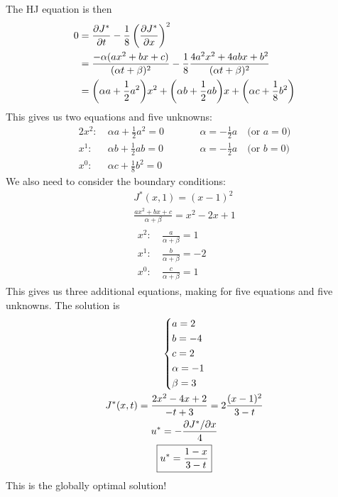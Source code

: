 The HJ equation is then
\begin{align}
  0 &= \frac{\partial J^*}{\partial t} - \frac{1}{8} \left(\frac{\partial J^*}{\partial x}\right)^2 \\
    &= \frac{-\alpha(ax^2 + bx + c)}{(\alpha t + \beta)^2} - \frac{1}{8} \frac{4a^2x^2 + 4abx + b^2}{(\alpha t + \beta)^2} \\
    &= \bigg(\alpha a + \frac12 a^2\bigg) x^2 + \bigg(\alpha b + \frac12 ab\bigg) x + \bigg(\alpha c + \frac18 b^2\bigg)
\end{align}
This gives us two equations and five unknowns:
\begin{alignat}{2}
  x^2:\ & \alpha a + \frac12 a^2 = 0 & \qquad & \alpha = -\frac12 a \quad \text{(or $a=0$)} \\
  x^1:\ & \alpha b + \frac12 ab = 0 && \alpha = -\frac12 a \quad \text{(or $b=0$)} \\
  x^0:\ & \alpha c + \frac18 b^2 = 0
\end{alignat}
We also need to consider the boundary conditions:
\begin{gather}
  J^*(x,1) = (x-1)^2 \\
  \frac{ax^2 + bx + c}{\alpha + \beta} = x^2 - 2x + 1 \\
  \begin{aligned}
    x^2:\ & \frac{a}{\alpha+\beta} = 1 \\
    x^1:\ & \frac{b}{\alpha+\beta} = -2 \\
    x^0:\ & \frac{c}{\alpha+\beta} = 1
  \end{aligned}
\end{gather}
This gives us three additional equations, making for five equations and five unknowns. The solution is
\begin{gather}
  \begin{dcases}
    a = 2 \\
    b = -4 \\
    c = 2 \\
    \alpha = -1 \\
    \beta = 3
  \end{dcases} \\
  J^*(x,t) = \frac{2x^2 - 4x + 2}{-t + 3} = 2 \frac{(x-1)^2}{3-t} \\
  u^* = -\frac{\partial J^*/\partial x}{4} \\
  \boxed{u^* = \frac{1-x}{3-t}}
\end{gather}
This is the globally optimal solution!

